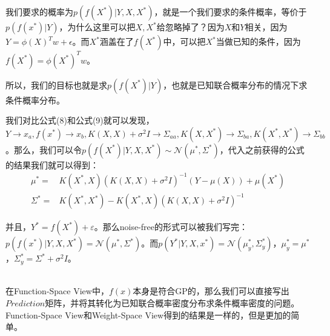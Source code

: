 \documentclass[a4paper]{article}
\begin{document}
我们要求的概率为$p(f(X^\ast)|Y,X,X^\ast)$，就是一个我们要求的条件概率，等价于$p(f(x^\ast)|Y)$，为什么这里可以把$X,X^\ast$给忽略掉了？因为$X$和$Y$相关，因为$Y=\phi(X)^Tw+\epsilon$。而$X^\ast$涵盖在了$f(X^\ast)$中，可以把$X^\ast$当做已知的条件，因为$f(X^\ast) = \phi(X^\ast)^Tw$。


所以，我们的目标也就是求$p(f(X^\ast)|Y)$，也就是{\color{red}已知联合概率分布的情况下求条件概率分布。}

我们对比公式(8)和公式(9)就可以发现，$Y\rightarrow x_a,f(x^\ast)\rightarrow x_b,K(X,X)+\sigma^2I \rightarrow \Sigma_{aa},K(X,X^\ast) \rightarrow \Sigma_{ba},K(X^\ast,X^\ast)\rightarrow \Sigma_{bb}$。那么，我们可以令$p(f(X^\ast)|Y,X,X^\ast)\sim\mathcal{N}(\mu^\ast,\Sigma^\ast)$，代入之前获得的公式的结果我们就可以得到：
\begin{equation}
    \begin{split}
        \mu^\ast = & K(X^\ast,X)(K(X,X)+\sigma^2I)^{-1}(Y-\mu(X))+\mu(X^\ast) \\
        \Sigma^\ast = & 
        K(X^\ast,X^\ast)-K(X^\ast,X)(K(X,X)+\sigma^2I)^{-1}
    \end{split}
\end{equation}

并且，$Y^\ast = f(X^\ast) + \varepsilon$。那么noise-free的形式可以被我们写完：$p(f(x^\ast)|Y,X,X^\ast) = \mathcal{N}(\mu^\ast,\Sigma^\ast)$。而$p(Y^\ast|Y,X,x^\ast) = \mathcal{N}(\mu^\ast_y,\Sigma^\ast_y)$，$\mu_{y}^\ast = \mu^{\ast}$，$\Sigma_y^{\ast} = \Sigma^\ast + \sigma^2I$。

~\\

在Function-Space View中，$f(x)$本身是符合GP的，那么我们可以直接写出$Prediction$矩阵，并将其转化为已知联合概率密度分布求条件概率密度的问题。Function-Space View和Weight-Space View得到的结果是一样的，但是更加的简单。
\end{document}
